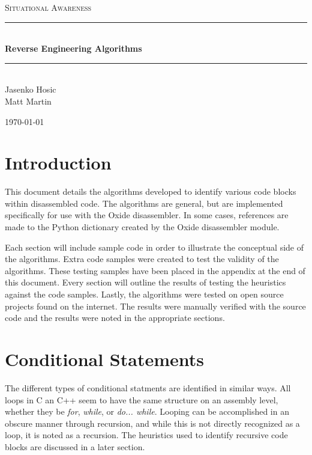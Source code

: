 \documentclass{article}
\newcommand{\HRule}{\rule{\linewidth}{0.5mm}}
\begin{document}
\begin{titlepage}
\begin{center}

\textsc{\LARGE Situational Awareness}\\[1.5cm]

\HRule \\[0.4cm]
{ \huge \bfseries Reverse Engineering Algorithms}\\[0.4cm]

\HRule \\[1.5cm]

\vspace{5cm}
{\large Jasenko Hosic}\\
{\large Matt Martin}

\vfill
{\large \today}
\end{center}
\end{titlepage}

\pagebreak
\tableofcontents
\pagebreak


\section*{Introduction}
This document details the algorithms developed to identify various code blocks within disassembled code.  The algorithms are general, but 
are implemented specifically for use with the Oxide disassembler.  In some cases, references are made to the Python dictionary created by the Oxide disassembler module.

Each section will include sample code in order to illustrate the conceptual side of the algorithms.  Extra code samples were created to 
test the validity of the algorithms.  These testing samples have been placed in the appendix at the end of this document. Every section 
will outline the results of testing the heuristics against the code samples.  Lastly, the algorithms were tested on open source projects found
on the internet.  The results were manually verified with the source code and the results were noted in the appropriate sections.

\pagebreak

\section*{Conditional Statements}
The different types of conditional statments are identified in similar ways. All loops in C an C++ seem to have the same structure on an 
assembly level, whether they be \emph{for}, \emph{while}, or \emph{do... while}.  Looping can be accomplished in an obscure manner through
recursion, and while this is not directly recognized as a loop, it is noted as a recursion.  The heuristics used to identify recursive code
blocks are discussed in a later section.
\end{document}

